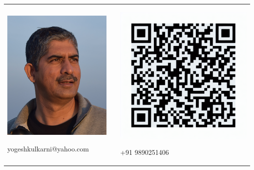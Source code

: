 \documentclass{article}
\begin{document}
\begin{tabular}{@{}p{}@{}p{}@{}p{}@{}}
\centering
\includegraphics[width=\linewidth,keepaspectratio]{myphoto} 

yogeshkulkarni@yahoo.com
&
& 
\centering
\includegraphics[width=\linewidth,keepaspectratio]{mylinkedinqr}

+91 9890251406
\end{tabular}
\end{document}
